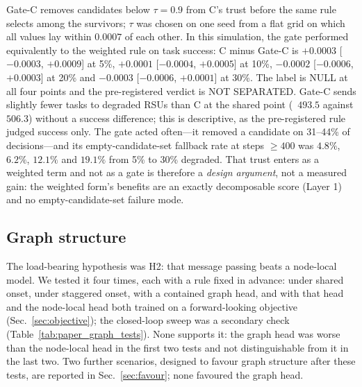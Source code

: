 Gate-C removes candidates below $\tau=0.9$ from C's trust before the same rule selects among the survivors; $\tau$ was chosen on one seed from a flat grid on which all values lay within $0.0007$ of each other.
In this simulation, the gate performed equivalently to the weighted rule on task success: C minus Gate-C is $+0.0003$ [$-0.0003$, $+0.0009$] at 5\%, $+0.0001$ [$-0.0004$, $+0.0005$] at 10\%, $-0.0002$ [$-0.0006$, $+0.0003$] at 20\% and $-0.0003$ [$-0.0006$, $+0.0001$] at 30\%.
The label is NULL at all four points and the pre-registered verdict is NOT SEPARATED.
Gate-C sends slightly fewer tasks to degraded RSUs than C at the shared point (\nwin\ $493.5$ against $506.3$) without a success difference; this is descriptive, as the pre-registered rule judged success only.
The gate acted often---it removed a candidate on 31--44\% of decisions---and its empty-candidate-set fallback rate at steps $\ge 400$ was $4.8\%$, $6.2\%$, $12.1\%$ and $19.1\%$ from 5\% to 30\% degraded.
That trust enters as a weighted term and not as a gate is therefore a \emph{design argument}, not a measured gain: the weighted form's benefits are an exactly decomposable score (Layer 1) and no empty-candidate-set failure mode.

\subsection{Graph structure}
\label{sec:graph}

The load-bearing hypothesis was H2: that message passing beats a node-local model.
We tested it four times, each with a rule fixed in advance: under shared onset, under staggered onset, with a contained graph head, and with that head and the node-local head both trained on a forward-looking objective (Sec.~\ref{sec:objective}); the closed-loop sweep was a secondary check (Table~\ref{tab:paper_graph_tests}).
None supports it: the graph head was worse than the node-local head in the first two tests and not distinguishable from it in the last two.
Two further scenarios, designed to favour graph structure after these tests, are reported in Sec.~\ref{sec:favour}; none favoured the graph head.



